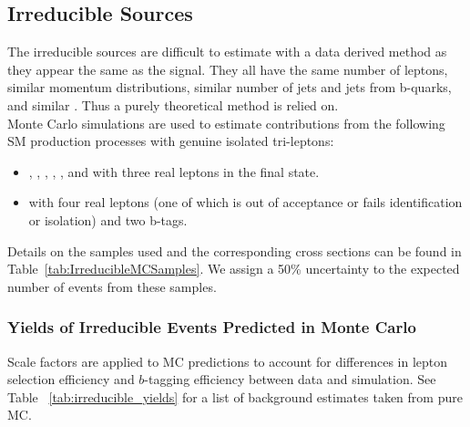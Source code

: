 	\subsection{Irreducible Sources}
	\label{sec:irreducible_sources}
        		The irreducible sources are difficult to estimate with a data derived method as they appear the same as the signal. They all have the same number of leptons, similar momentum distributions, similar number of jets and jets from b-quarks, and similar \met. Thus a purely theoretical method is relied on.\\ 
		
        
Monte Carlo simulations are used to estimate contributions from the following SM production processes with genuine isolated tri-leptons:

\begin{itemize}
\item \WZZ, \ttWW, \ttW, \tbZ, \ttG, and \ttH with three real leptons in the final state.
\item \ZZZ with four real leptons (one of which is out of acceptance or fails identification or isolation) and two b-tags.
\end{itemize}




Details on the samples used and the corresponding cross sections can be found in Table~\ref{tab:IrreducibleMCSamples}.  
We assign a 50\% uncertainty to the expected number of events from these samples.\\
		
		\subsubsection{Yields of Irreducible Events Predicted in Monte Carlo}
		
Scale factors are applied to MC predictions to account for differences in lepton selection efficiency and $b$-tagging efficiency between data and simulation. See Table ~\ref{tab:irreducible_yields} for a list of background estimates taken from pure MC.\\



